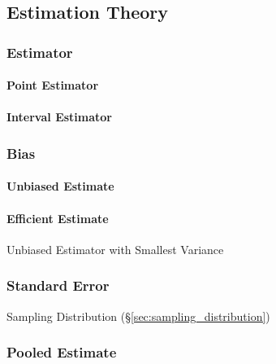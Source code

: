 \subsection{Estimation Theory}\label{sec:estimation_theory}

\subsubsection{Estimator}\label{sec:estimator}

\paragraph{Point Estimator}\label{sec:point_estimator}\hfill

\paragraph{Interval Estimator}\label{sec:interval_estimator}\hfill



\subsubsection{Bias}\label{sec:bias}

\paragraph{Unbiased Estimate}\label{sec:unbiased_estimate}\hfill

\paragraph{Efficient Estimate}\label{sec:efficient_estimate}\hfill

Unbiased Estimator with Smallest Variance



\subsubsection{Standard Error}\label{sec:standard_error}

Sampling Distribution (\S\ref{sec:sampling_distribution})



\subsubsection{Pooled Estimate}\label{sec:pooled_estimate}

